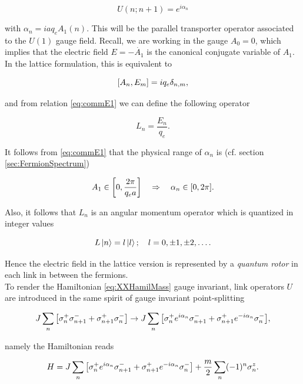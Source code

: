 \begin{equation}
    U(n;n+1)  = e^{i\alpha_n}
\end{equation}

with $\alpha_n =i a q_e A_1(n)$. This will be the parallel transporter operator associated to the $U(1)$ gauge field. Recall, we are working in the gauge $A_0=0$, which implies that the electric field $E = -\dot{A_1}$ is the canonical conjugate variable of $A_1$. In the lattice formulation, this is equivalent to

\begin{equation}
    \comm{A_n}{E_m} = i q_e\delta_{n,m}\label{eq:commE1},
\end{equation}
 
and from relation \eqref{eq:commE1} we can define the following operator

\begin{equation}
L_n = \frac{E_n}{q_e}.
\end{equation}

It follows from \eqref{eq:commE1} that the  physical range of $\alpha_n$ is (cf. section \ref{sec:FermionSpectrum})

\begin{equation}
A_1 \in \qty[0,\frac{2\pi}{q_ea}]\quad \Rightarrow \quad \alpha_n \in [0,2\pi].
\end{equation}

Also, it follows that $L_n$ is an angular momentum operator which is quantized in integer values

\begin{equation}
L\ket{n}=l\ket{l};\quad l=0,\pm1,\pm2,\ldots.\label{eq:lQuant}
\end{equation}

Hence the electric field in the lattice version is represented by a \emph{quantum rotor} in each link in between the fermions.\\

To render the Hamiltonian \eqref{eq:XXHamilMass} gauge invariant, link operators $U$ are introduced in the same spirit of gauge invariant point-splitting

\begin{equation}
J\sum_n\qty[\sigma^+_n\sigma^-_{n+1} + \sigma^+_{n+1}\sigma^-_n] \to J\sum_n\qty[\sigma^+_n e^{i\alpha_n}  \sigma^-_{n+1} + \sigma^+_{n+1} e^{-i\alpha_n}\sigma^-_n],
\end{equation}

namely the Hamiltonian reads

\begin{equation}
H = J\sum_n\qty[\sigma^+_n e^{i\alpha_n}  \sigma^-_{n+1} + \sigma^+_{n+1} e^{-i\alpha_n}\sigma^-_n] + \frac{m}{2}\sum_n (-1)^n\sigma^z_n.
\end{equation}


